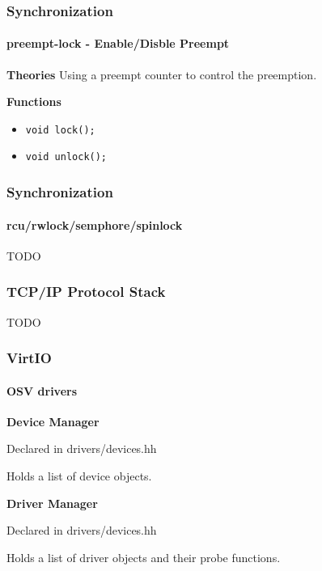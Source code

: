 \documentclass[10pt]{beamer}
\begin{document}
\begin{frame}
	\frametitle{Synchronization}
	\framesubtitle{preempt-lock - Enable/Disble Preempt}

	\textbf{Theories}
	Using a preempt counter to control the preemption.
	
	\smallskip

	\textbf{Functions}
	\begin{itemize}
		\item \texttt{void lock();}
		\item \texttt{void unlock();}
	\end{itemize}
	
\end{frame}


\begin{frame}
	\frametitle{Synchronization}
	\framesubtitle{rcu/rwlock/semphore/spinlock}

	\center
	TODO
	
\end{frame}

\begin{frame}
	\frametitle{TCP/IP Protocol Stack}

	\center
	TODO
	
\end{frame}


\begin{frame}
	\frametitle{VirtIO}
	\framesubtitle{OSV drivers}

	\textbf{Device Manager}
	
	Declared in drivers/devices.hh
	
	Holds a list of device objects.
	
	\medskip
	
	\textbf{Driver Manager}
	
	Declared in drivers/devices.hh
	
	Holds a list of driver objects and their probe functions.
	
\end{frame}
\end{document}
